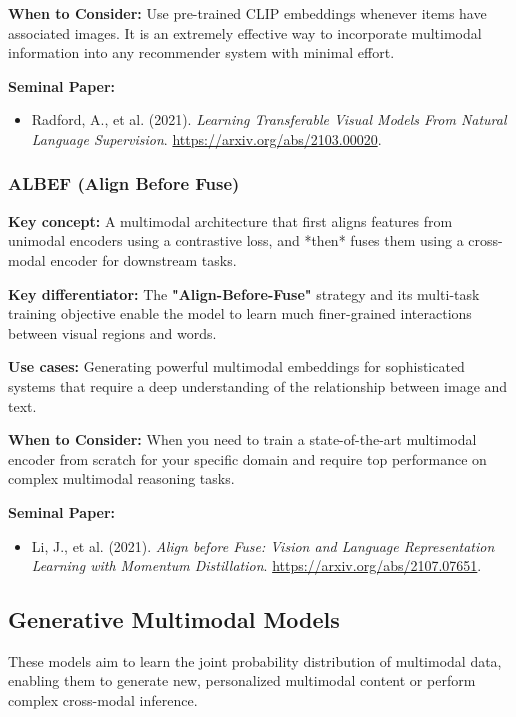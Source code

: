 \documentclass{article}
\begin{document}
\noindent\textbf{When to Consider:} Use pre-trained CLIP embeddings whenever items have associated images. It is an extremely effective way to incorporate multimodal information into any recommender system with minimal effort.

\noindent\textbf{Seminal Paper:}
    \begin{itemize}
        \item Radford, A., et al. (2021). \textit{Learning Transferable Visual Models From Natural Language Supervision}. \url{https://arxiv.org/abs/2103.00020}.
    \end{itemize}

    \subsubsection{ALBEF (Align Before Fuse)}
\noindent\textbf{Key concept:} A multimodal architecture that first aligns features from unimodal encoders using a contrastive loss, and *then* fuses them using a cross-modal encoder for downstream tasks.

\noindent\textbf{Key differentiator:} The \textbf{"Align-Before-Fuse"} strategy and its multi-task training objective enable the model to learn much finer-grained interactions between visual regions and words.

\noindent\textbf{Use cases:} Generating powerful multimodal embeddings for sophisticated systems that require a deep understanding of the relationship between image and text.

\noindent\textbf{When to Consider:} When you need to train a state-of-the-art multimodal encoder from scratch for your specific domain and require top performance on complex multimodal reasoning tasks.

\noindent\textbf{Seminal Paper:}
    \begin{itemize}
        \item Li, J., et al. (2021). \textit{Align before Fuse: Vision and Language Representation Learning with Momentum Distillation}. \url{https://arxiv.org/abs/2107.07651}.
    \end{itemize}
    
    \subsection{Generative Multimodal Models}
    These models aim to learn the joint probability distribution of multimodal data, enabling them to generate new, personalized multimodal content or perform complex cross-modal inference.
    
\end{document}
